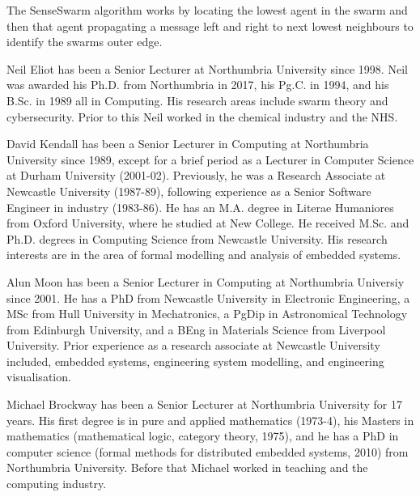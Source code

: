 \documentclass{ieeeaccess}
\begin{document}
The SenseSwarm algorithm works by locating the lowest agent in the swarm and then that agent propagating a message left and right to next lowest neighbours to identify the swarms outer edge. 




    \begin{IEEEbiography}{Neil Eliot}
	has been a Senior Lecturer at Northumbria University since 1998.  Neil was awarded his Ph.D. from Northumbria in 2017, his Pg.C. in 1994, and his B.Sc. in 1989 all in Computing. His research areas include swarm theory and cybersecurity. Prior to this Neil worked in the chemical industry and the NHS. 
	\end{IEEEbiography}
	
	\begin{IEEEbiography}{David Kendall}
	has been a Senior Lecturer in Computing at Northumbria University since 1989, except for a brief period as a Lecturer in Computer Science at Durham University (2001-02). Previously, he was a Research Associate at Newcastle University (1987-89), following experience as a Senior Software Engineer in industry (1983-86). He has an M.A. degree in Literae Humaniores from Oxford University, where he studied at New College. He received M.Sc. and Ph.D. degrees in Computing Science from Newcastle University. His research interests are in the area of formal modelling and analysis of embedded systems. 
	\end{IEEEbiography}
	
	\begin{IEEEbiography}{Alun Moon} has been a Senior Lecturer in Computing at Northumbria Universiy since 2001. He has a PhD from Newcastle University in Electronic Engineering, a MSc from Hull University in Mechatronics, a PgDip in Astronomical Technology from Edinburgh University, and a BEng in Materials Science from Liverpool University.
		Prior experience as a research associate at Newcastle University included, embedded systems, engineering system modelling, and engineering visualisation.
	\end{IEEEbiography}  
		
	\begin{IEEEbiography}{Michael Brockway}
	has been a Senior Lecturer at Northumbria University for 17 years. His first degree is in pure and applied mathematics (1973-4), his Masters in mathematics (mathematical logic, category theory, 1975), and he has a PhD in computer science (formal methods for distributed embedded systems, 2010) from Northumbria University. Before that Michael worked in teaching and the computing industry.
	\end{IEEEbiography}

\EOD
\end{document}
